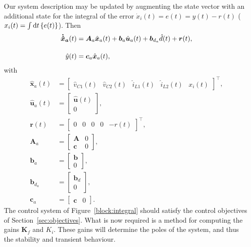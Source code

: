 Our system description may be updated by augmenting the state vector with an additional state for the integral of the error $\dot{x}_i(t) = e(t) = y(t) - r(t)$ ($x_i(t) = \int \mathrm{d}t \left\{e(t)\right\}$). Then
\begin{align*}
\boldsymbol{\dispdot[0mu]{\hat{x}}_a}(t) &= \boldsymbol{A}_a\hat{\boldsymbol{x}}_a(t) + \boldsymbol{b}_a \hat{\boldsymbol{u}}_a(t) + \boldsymbol{b}_{d_a} \hat{d}(t) + \boldsymbol{r}(t),
\\[11pt]
\hat{y}(t) &= \boldsymbol{c}_a \hat{\boldsymbol{x}}_a(t),
\end{align*}
with
\begingroup
\allowdisplaybreaks
\begin{align}
\hat{\boldsymbol{x}}_a (t) &=
\begin{bmatrix}
\hat{v}_{C1} (t) & \hat{v}_{C2} (t) & \hat{i}_{L1} (t) & \hat{i}_{L2} (t) & x_i (t)
\end{bmatrix}^\intercal,
\\[11pt]
\hat{\boldsymbol{u}}_a (t) &=
\begin{bmatrix}
\hat{\boldsymbol{u}} (t) \\ 0
\end{bmatrix},
\\[11pt]
\boldsymbol{r}(t) &=
\begin{bmatrix}
0 & 0 & 0 & 0 & \minus r(t)
\end{bmatrix}^\intercal,
\\[11pt]
\boldsymbol{A}_a &=
\begin{bmatrix}
\boldsymbol{A} & 0\\
\boldsymbol{c} & 0
\end{bmatrix},
\label{eqn:augmentedA}
\\[11pt]
\boldsymbol{b}_a
&=
\begin{bmatrix}
\boldsymbol{b} \\ 0
\end{bmatrix},
\\[11pt]
\boldsymbol{b}_{d_a}
&=
\begin{bmatrix}
\boldsymbol{b}_d \\ 0
\end{bmatrix},
\label{eqn:augmentedbD}
\\[11pt]
\boldsymbol{c}_a
&=
\begin{bmatrix}
\boldsymbol{c} & 0
\end{bmatrix}.
\end{align}
\endgroup
The control system of Figure~\ref{block:integral} should satisfy the control objectives of Section~\ref{sec:objectives}. What is now required is a method for computing the gains $\boldsymbol{K}_f$ and $K_i$. These gains will determine the poles of the system, and thus the stability and transient behaviour.
